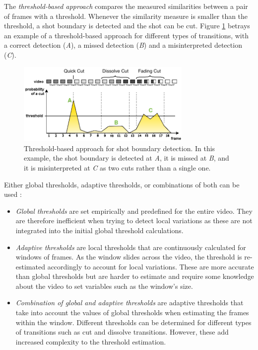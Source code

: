 The \textit{threshold-based approach} compares the measured similarities between a pair of frames with a threshold. Whenever the similarity measure is smaller than the threshold, a shot boundary is detected and the shot can be cut. Figure \ref{fig:shot_boundary_detection_threshold} betrays an example of a threshold-based approach for different types of transitions, with a correct detection (\emph{A}), a missed detection (\emph{B}) and a misinterpreted detection (\emph{C}).\\

\begin{figure}[h] 
\centerline{\includegraphics[width=0.75\textwidth]{figures/shot_boundary_detection_threshold.png}}
\caption{\label{fig:shot_boundary_detection_threshold}Threshold-based approach for shot boundary detection. In this example, the shot boundary is detected at \emph{A}, it is missed at \emph{B}, and it is misinterpreted at \emph{C} as two cuts rather than a single one.}
\end{figure}

Either global thresholds, adaptive thresholds, or combinations of both can be used \cite{cernekova2006information} \cite{hu2011survey}:
\begin{itemize}
    \item \textit{Global thresholds} are set empirically and predefined for the entire video. They are therefore inefficient when trying to detect local variations as these are not integrated into the initial global threshold calculations.
    \item \textit{Adaptive thresholds} are local thresholds that are continuously calculated for windows of frames. As the window slides across the video, the threshold is re-estimated accordingly to account for local variations. These are more accurate than global thresholds but are harder to estimate and require some knowledge about the video to set variables such as the window's size.
    \item \textit{Combination of global and adaptive thresholds} are adaptive thresholds that take into account the values of global thresholds when estimating the frames within the window. Different thresholds can be determined for different types of transitions such as cut and dissolve transitions. However, these add increased complexity to the threshold estimation.
\end{itemize}

